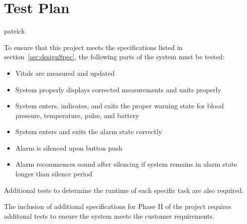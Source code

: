 \documentclass[12pt]{article} %
\begin{document}
    \section{Test Plan} patrick

    To ensure that this project meets the specifications listed in 
    section~\ref{sec:designSpec}, the following parts of the system must be 
    tested: 

    \begin{itemize}
      \item Vitals are measured and updated
      \item System properly displays corrected measurements and units properly
      \item System enters, indicates, and exits the proper warning state for
	blood pressure, temperature, pulse, and battery
      \item System enters and exits the alarm state correctly
      \item Alarm is silenced upon button push
      \item Alarm recommences sound after silencing if system remains in alarm
	state longer than silence period
    \end{itemize}

    Additional tests to determine the runtime of each specific task are also
    required.

    The inclusion of additional specifications for Phase II of the project
    requires additonal tests to ensure the system meets the customer
    requirements.
\end{document}
